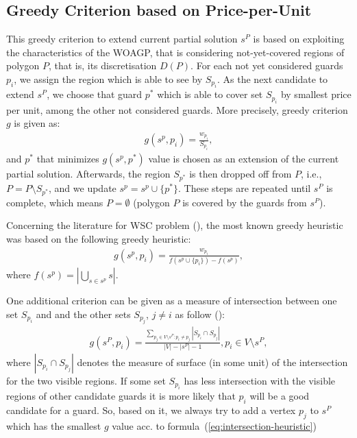 \documentclass[runningheads,a4paper]{llncs}
\begin{document}
      \subsection{Greedy Criterion based on Price-per-Unit}
       This greedy criterion to extend current partial solution $s^P$  is based on exploiting the characteristics of the  WOAGP, that is considering not-yet-covered regions of polygon $P$, that is, its discretisation $D(P)$. For each not yet considered guards $p_i$, we assign the region which is able to see by $S_{p_i}$. As the next candidate to extend $s^P$, we choose that guard $p^*$ which is able to cover set $S_{p_i}$ by smallest price per unit, among the other not considered guards. More precisely, greedy criterion $g$ is given as:
       \begin{align}
            g(s^p, p_i) = \frac{w_{p_i}}{S_{p_i}},
       \end{align}
       and $p^*$ that minimizes $g(s^p, p^*)$ value is chosen as an extension of the current partial solution.
       Afterwards, the region $S_{p^*}$ is then dropped off from $P$, i.e., $P=P \setminus S_{p^*}$, and we update $s^p= s^p \cup \{p^*\}$.  These steps are repeated until $s^P$ is complete, which means $P = \emptyset$ (polygon $P$ is covered by the guards from $s^P$).

       Concerning the literature for WSC problem (), the most known greedy heuristic was based on the following greedy heuristic:
       \begin{align}
          g(s^p, p_i) = \frac{w_{p_i}}{ f(s^p \cup \{p_i\})  - f(s^p)},
       \end{align}
      where $f(s^p) = |\bigcup_{s \in s^p} s |$.
      
      One additional criterion can be given as a measure of intersection between one set  $S_{p_i}$ and 
      and the other sets $S_{p_j}$, $j \neq i$ as follow ():
      \begin{align}\label{eq:intersection-heuristic}
      	   g(s^P,p_i) = \frac{\sum_{p_j \in V \setminus s^P: p_i \neq p_j}|S_{p_i} \cap S_{p_j}|}{|V|-|s^P|-1}, p_i \in V \setminus s^P,
      \end{align}
      where $|S_{p_i} \cap S_{p_j}|$ denotes the measure of surface (in some unit) of the intersection for the two 
      visible regions. If some set $S_{p_i}$ has less intersection with the  visible regions of other candidate guards it is more likely that $p_i$ will be a good candidate for a guard. So, based on it, we always try to  add a vertex $p_j$ to $s^P$ which has the smallest $g$ value acc. to formula~(\ref{eq:intersection-heuristic}) 
      
\end{document}
